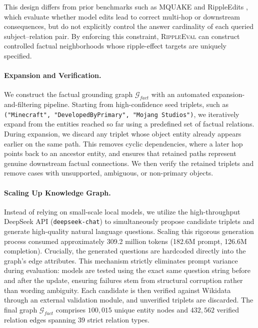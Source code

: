 This design differs from prior benchmarks such as MQUAKE \cite{zhong2023mquake} and RippleEdits \cite{cohen2023ripple}, which evaluate whether model edits lead to correct multi-hop or downstream consequences, but do not explicitly control the answer cardinality of each queried subject--relation pair. By enforcing this constraint, \textsc{RippleEval} can construct controlled factual neighborhoods whose ripple-effect targets are uniquely specified.


\paragraph{Expansion and Verification.}
We construct the factual grounding graph $\mathcal{G}_{fact}$ with an automated expansion-and-filtering pipeline. Starting from high-confidence seed triplets, such as \texttt{("Minecraft", "DevelopedByPrimary", "Mojang Studios")}, we iteratively expand from the entities reached so far using a predefined set of factual relations. During expansion, we discard any triplet whose object entity already appears earlier on the same path. This removes cyclic dependencies, where a later hop points back to an ancestor entity, and ensures that retained paths represent genuine downstream factual connections. We then verify the retained triplets and remove cases with unsupported, ambiguous, or non-primary objects.

\paragraph{Scaling Up Knowledge Graph.}
Instead of relying on small-scale local models, we utilize the high-throughput DeepSeek API (\texttt{deepseek-chat}) to simultaneously propose candidate triplets and generate high-quality natural language questions. Scaling this rigorous generation process consumed approximately 309.2 million tokens (182.6M prompt, 126.6M completion). Crucially, the generated questions are hardcoded directly into the graph's edge attributes. This mechanism strictly eliminates prompt variance during evaluation: models are tested using the exact same question string before and after the update, ensuring failures stem from structural corruption rather than wording ambiguity. Each candidate is then verified against Wikidata \cite{vrandecic2014wikidata} through an external validation module, and unverified triplets are discarded. The final graph $\mathcal{G}_{fact}$ comprises $100,015$ unique entity nodes and $432,562$ verified relation edges spanning 39 strict relation types.

